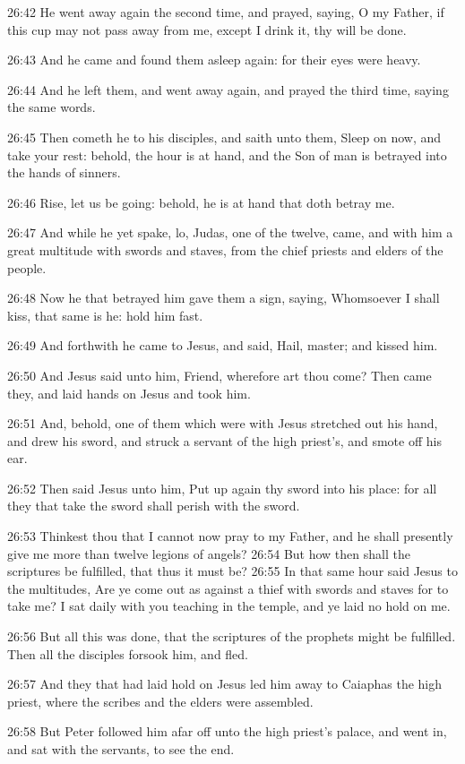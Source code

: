 26:42 He went away again the second time, and prayed, saying, O my Father, if this cup may not pass away from me, except I drink it, thy will be done.

26:43 And he came and found them asleep again: for their eyes were heavy.

26:44 And he left them, and went away again, and prayed the third time, saying the same words.

26:45 Then cometh he to his disciples, and saith unto them, Sleep on now, and take your rest: behold, the hour is at hand, and the Son of man is betrayed into the hands of sinners.

26:46 Rise, let us be going: behold, he is at hand that doth betray me.

26:47 And while he yet spake, lo, Judas, one of the twelve, came, and with him a great multitude with swords and staves, from the chief priests and elders of the people.

26:48 Now he that betrayed him gave them a sign, saying, Whomsoever I shall kiss, that same is he: hold him fast.

26:49 And forthwith he came to Jesus, and said, Hail, master; and kissed him.

26:50 And Jesus said unto him, Friend, wherefore art thou come? Then came they, and laid hands on Jesus and took him.

26:51 And, behold, one of them which were with Jesus stretched out his hand, and drew his sword, and struck a servant of the high priest's, and smote off his ear.

26:52 Then said Jesus unto him, Put up again thy sword into his place: for all they that take the sword shall perish with the sword.

26:53 Thinkest thou that I cannot now pray to my Father, and he shall presently give me more than twelve legions of angels?  26:54 But how then shall the scriptures be fulfilled, that thus it must be?  26:55 In that same hour said Jesus to the multitudes, Are ye come out as against a thief with swords and staves for to take me? I sat daily with you teaching in the temple, and ye laid no hold on me.

26:56 But all this was done, that the scriptures of the prophets might be fulfilled. Then all the disciples forsook him, and fled.

26:57 And they that had laid hold on Jesus led him away to Caiaphas the high priest, where the scribes and the elders were assembled.

26:58 But Peter followed him afar off unto the high priest's palace, and went in, and sat with the servants, to see the end.

